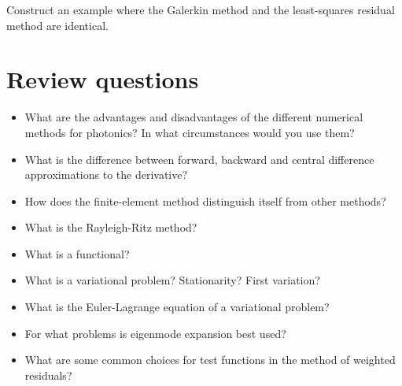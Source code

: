 \begin{exer}
Construct an example where the Galerkin method and the least-squares residual method are identical.
\end{exer}



\section*{Review questions}

\begin{itemize}
\item What are the advantages and disadvantages of the different numerical methods for photonics? In what circumstances would you use them?
\item What is the difference between forward, backward and central difference approximations to the derivative?
\item How does the finite-element method distinguish itself from other methods?
\item What is the Rayleigh-Ritz method?
\item What is a functional?
\item What is a variational problem? Stationarity? First variation?
\item What is the Euler-Lagrange equation of a variational problem?
\item For what problems is eigenmode expansion best used?
\item What are some common choices for test functions in the method of weighted residuals?  
\end{itemize}

